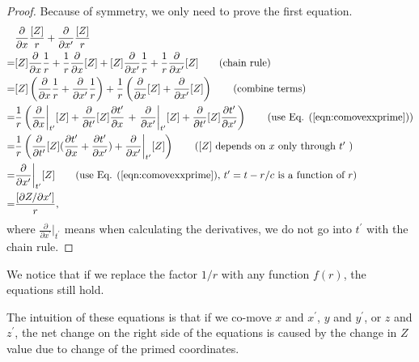 \documentclass[11pt]{article}              %
\begin{document}
\begin{proof}
Because of symmetry, we only need to prove the first equation.
\begin{align}
    &\frac{\partial}{\partial x}\frac{[Z]}{r}+\frac{\partial}{\partial x^\prime}\frac{[Z]}{r}\notag\\
    =&[Z]\frac{\partial}{\partial x}\frac{1}{r}+\frac{1}{r}\frac{\partial}{\partial x} [Z]+[Z]\frac{\partial}{\partial x^\prime}\frac{1}{r}+ \frac{1}{r}\frac{\partial}{\partial x^\prime} [Z]\tag{chain rule}\\
    =&[Z]\left(\frac{\partial}{\partial x}\frac{1}{r}+\frac{\partial}{\partial x^\prime}\frac{1}{r}\right)+\frac{1}{r}\left(\frac{\partial}{\partial x} [Z]+\frac{\partial}{\partial x^\prime} [Z]\right)\tag{combine terms}\\
    =&\frac{1}{r}\left(\frac{\partial}{\partial x}\bigg\rvert_{t^\prime} [Z]+\frac{\partial}{\partial t^\prime} [Z]\frac{\partial t^\prime}{\partial x}\right. +\left.\frac{\partial}{\partial x^\prime}\bigg\rvert_{t^\prime} [Z]+\frac{\partial}{\partial t^\prime} [Z]\frac{\partial t^\prime}{\partial x^\prime}\right)\tag{use Eq. (\ref{eqn:comovexxprime})}\\
    =&\frac{1}{r}\left(\frac{\partial}{\partial t^\prime} [Z](\frac{\partial t^\prime}{\partial x}+\frac{\partial t^\prime}{\partial x^\prime})+\frac{\partial}{\partial x^\prime}\bigg\rvert_{t^\prime} [Z]\right)\tag{$[Z]$ depends on $x$ only through $t^\prime$ }\\
    =&\frac{\partial}{\partial x^\prime}\bigg\rvert_{t^\prime} [Z]\tag{use Eq. (\ref{eqn:comovexxprime}), $t^\prime=t-r/c$ is a function of $r$}\\
    =&\frac{[\partial Z/ \partial x^\prime]}{r},\notag
\end{align}
where $\frac{\partial}{\partial x^\prime}|_{t^\prime}$ means when calculating the derivatives, we do not go into $t^\prime$ with the chain rule.
\end{proof}
We notice that if we replace the factor $1/r$ with any function $f(r)$, the equations still hold.

The intuition of these equations is that if we co-move $x$ and $x^\prime$, $y$ and $y^\prime$, or $z$ and $z^\prime$, the net change on the right side of the equations is caused by the change in $Z$ value due to change of the primed coordinates.
\end{document}
